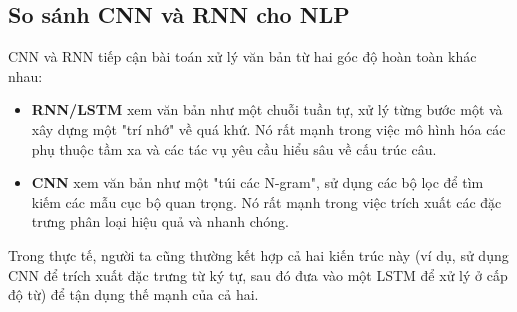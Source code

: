 \subsection{So sánh CNN và RNN cho NLP}
CNN và RNN tiếp cận bài toán xử lý văn bản từ hai góc độ hoàn toàn khác nhau:
\begin{itemize}
    \item \textbf{RNN/LSTM} xem văn bản như một chuỗi tuần tự, xử lý từng bước một và xây dựng một "trí nhớ" về quá khứ. Nó rất mạnh trong việc mô hình hóa các phụ thuộc tầm xa và các tác vụ yêu cầu hiểu sâu về cấu trúc câu.
    \item \textbf{CNN} xem văn bản như một "túi các N-gram", sử dụng các bộ lọc để tìm kiếm các mẫu cục bộ quan trọng. Nó rất mạnh trong việc trích xuất các đặc trưng phân loại hiệu quả và nhanh chóng.
\end{itemize}
Trong thực tế, người ta cũng thường kết hợp cả hai kiến trúc này (ví dụ, sử dụng CNN để trích xuất đặc trưng từ ký tự, sau đó đưa vào một LSTM để xử lý ở cấp độ từ) để tận dụng thế mạnh của cả hai.